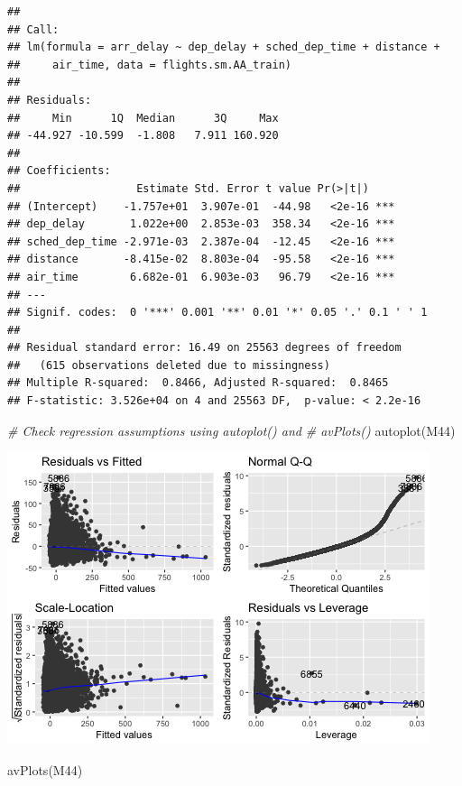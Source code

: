 \documentclass[
]{article}
\newenvironment{Shaded}{\begin{snugshade}}{\end{snugshade}}
\newcommand{\CommentTok}[1]{\textcolor[rgb]{0.56,0.35,0.01}{\textit{#1}}}
\newcommand{\FunctionTok}[1]{\textcolor[rgb]{0.00,0.00,0.00}{#1}}
\newcommand{\NormalTok}[1]{#1}
\begin{document}
\begin{verbatim}
## 
## Call:
## lm(formula = arr_delay ~ dep_delay + sched_dep_time + distance + 
##     air_time, data = flights.sm.AA_train)
## 
## Residuals:
##     Min      1Q  Median      3Q     Max 
## -44.927 -10.599  -1.808   7.911 160.920 
## 
## Coefficients:
##                  Estimate Std. Error t value Pr(>|t|)    
## (Intercept)    -1.757e+01  3.907e-01  -44.98   <2e-16 ***
## dep_delay       1.022e+00  2.853e-03  358.34   <2e-16 ***
## sched_dep_time -2.971e-03  2.387e-04  -12.45   <2e-16 ***
## distance       -8.415e-02  8.803e-04  -95.58   <2e-16 ***
## air_time        6.682e-01  6.903e-03   96.79   <2e-16 ***
## ---
## Signif. codes:  0 '***' 0.001 '**' 0.01 '*' 0.05 '.' 0.1 ' ' 1
## 
## Residual standard error: 16.49 on 25563 degrees of freedom
##   (615 observations deleted due to missingness)
## Multiple R-squared:  0.8466, Adjusted R-squared:  0.8465 
## F-statistic: 3.526e+04 on 4 and 25563 DF,  p-value: < 2.2e-16
\end{verbatim}

\begin{Shaded}
\begin{Highlighting}[]
\CommentTok{\# Check regression assumptions using autoplot() and}
\CommentTok{\# avPlots()}
\FunctionTok{autoplot}\NormalTok{(M44)}
\end{Highlighting}
\end{Shaded}

\includegraphics{HW3-Trinath-Sai-Subhash-Reddy-Pittala_files/figure-latex/unnamed-chunk-10-1.png}

\begin{Shaded}
\begin{Highlighting}[]
\FunctionTok{avPlots}\NormalTok{(M44)}
\end{Highlighting}
\end{Shaded}
\end{document}
